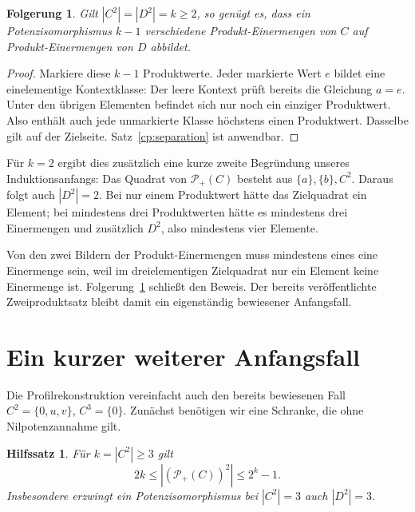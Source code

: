 \documentclass[a4paper,11pt]{article}
\newcommand{\Pp}[1]{\mathcal P_+(#1)}
\newtheorem{lemma}[satz]{Hilfssatz}
\newtheorem{korollar}[satz]{Folgerung}
\begin{document}
\begin{korollar}\label{cp:kminusone}
Gilt \(|C^2|=|D^2|=k\ge2\), so genügt es, dass ein
Potenzisomorphismus \(k-1\) verschiedene Produkt-Einermengen von
\(C\) auf Produkt-Einermengen von \(D\) abbildet.
\end{korollar}

\begin{proof}
Markiere diese \(k-1\) Produktwerte. Jeder markierte Wert \(e\)
bildet eine einelementige Kontextklasse: Der leere Kontext prüft
bereits die Gleichung \(a=e\). Unter den übrigen Elementen befindet
sich nur noch ein einziger Produktwert. Also enthält auch jede
unmarkierte Klasse höchstens einen Produktwert. Dasselbe gilt auf
der Zielseite. Satz~\ref{cp:separation} ist anwendbar.
\end{proof}

Für \(k=2\) ergibt dies zusätzlich eine kurze zweite Begründung
unseres Induktionsanfangs: Das Quadrat von \(\Pp C\) besteht aus
\(\{a\},\{b\},C^2\). Daraus folgt auch \(|D^2|=2\). Bei nur einem
Produktwert hätte das Zielquadrat ein Element; bei mindestens drei
Produktwerten hätte es mindestens drei Einermengen und zusätzlich
\(D^2\), also mindestens vier Elemente.

Von den zwei Bildern der Produkt-Einermengen muss mindestens eines
eine Einermenge sein, weil im dreielementigen Zielquadrat nur ein
Element keine Einermenge ist. Folgerung~\ref{cp:kminusone} schließt
den Beweis. Der bereits veröffentlichte Zweiproduktsatz bleibt damit
ein eigenständig bewiesener Anfangsfall.

\section{Ein kurzer weiterer Anfangsfall}

Die Profilrekonstruktion vereinfacht auch den bereits bewiesenen
Fall \(C^2=\{0,u,v\}\), \(C^3=\{0\}\). Zunächst benötigen wir eine
Schranke, die ohne Nilpotenzannahme gilt.

\begin{lemma}\label{cp:square-bound}
Für \(k=|C^2|\ge3\) gilt
\[
 2k\le|(\Pp C)^2|\le2^k-1.
\]
Insbesondere erzwingt ein Potenzisomorphismus bei \(|C^2|=3\)
auch \(|D^2|=3\).
\end{lemma}
\end{document}

